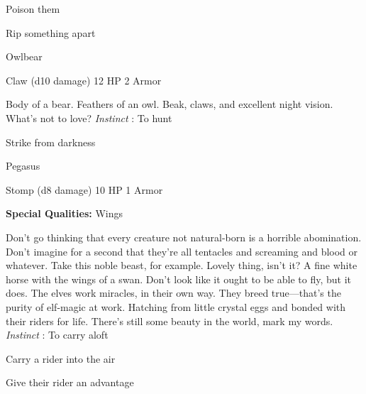 \startitemize[1,packed]
         
\item Poison them

         
\item Rip something apart

       
\stopitemize
       
\startMonsterName
Owlbear	 
\stopMonsterName
       

Claw (d10 damage)	12 HP	2 Armor

       


       
\startMonsterDescription
Body of a bear. Feathers of an owl. Beak, claws, and excellent night vision. What’s not to love? {\em Instinct} : To hunt
\stopMonsterDescription
       
\startitemize[1,packed]
         
\item Strike from darkness

       
\stopitemize
       
\startMonsterName
Pegasus	 
\stopMonsterName
       

Stomp (d8 damage)	10 HP	1 Armor

       


       
\startMonsterQualities
         {\bf Special Qualities:}  Wings
\stopMonsterQualities
       
\startMonsterDescription
Don’t go thinking that every creature not natural-born is a horrible abomination. Don’t imagine for a second that they’re all tentacles and screaming and blood or whatever. Take this noble beast, for example. Lovely thing, isn’t it? A fine white horse with the wings of a swan. Don’t look like it ought to be able to fly, but it does. The elves work miracles, in their own way. They breed true—that’s the purity of elf-magic at work. Hatching from little crystal eggs and bonded with their riders for life. There’s still some beauty in the world, mark my words. {\em Instinct} : To carry aloft
\stopMonsterDescription
       
\startitemize[1,packed]
         
\item Carry a rider into the air

         
\item Give their rider an advantage

